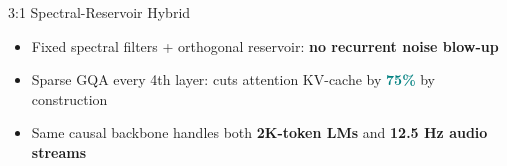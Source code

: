 \documentclass[aspectratio=169,10pt]{beamer}
\newcommand{\accentt}[1]{\textcolor{Teal}{\textbf{#1}}}
\begin{document}
\begin{frame}{3:1 Spectral-Reservoir Hybrid}
\begin{center}
{%
  }
  \end{center}
  \vspace*{0.42cm}
  \begin{itemize}\setlength{\itemsep}{0.60em}
    \item {\normalsize Fixed spectral filters + orthogonal reservoir: \textbf{no recurrent noise blow-up}}
    \item {\normalsize Sparse GQA every 4th layer: cuts attention KV-cache by \accentt{75\%} by construction}
    \item {\normalsize Same causal backbone handles both \textbf{2K-token LMs} and \textbf{12.5 Hz audio streams}}
  \end{itemize}
\end{frame}
\end{document}
